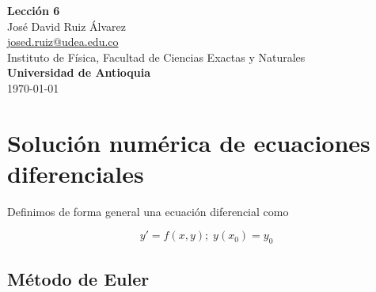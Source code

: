 \documentclass[10.5pt]{article}
\begin{document}
\noindent
\begin{minipage}[b]{0.75\linewidth}
{\LARGE\bf Lecci\'{o}n 6}\\ %
\large{Jos\'{e} David Ruiz \'{A}lvarez} \\
\small{\href{mailto:josed.ruiz@udea.edu.co}{josed.ruiz@udea.edu.co}} \\ %
\normalsize{Instituto de Física, Facultad de Ciencias Exactas y Naturales} \\%
\normalsize{\bf Universidad de Antioquia} \\[8mm]
\today %
\end{minipage}%



\section{Solución numérica de ecuaciones diferenciales}

Definimos de forma general una ecuación diferencial como

\begin{equation}
y'=f(x,y);\; y(x_{0})=y_{0}
\end{equation}

\subsection{Método de Euler}
\end{document}
